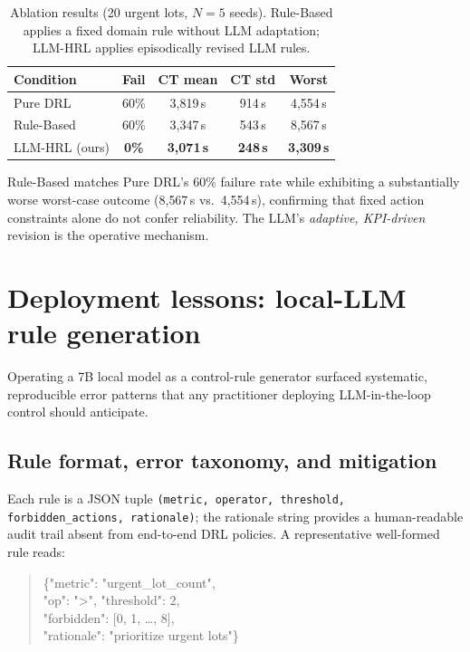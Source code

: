 \documentclass[10pt]{article}
\begin{document}
\begin{table}[thb]
\centering
\footnotesize
\caption{Ablation results (20 urgent lots, $N=5$ seeds).
Rule-Based applies a fixed domain rule without LLM adaptation;
LLM-HRL applies episodically revised LLM rules.}
\label{tab:ablation}
\setlength{\tabcolsep}{4pt}
\begin{tabularx}{\columnwidth}{@{}Xcccc@{}}
\toprule
\textbf{Condition} & \textbf{Fail} & \textbf{CT mean} & \textbf{CT std} & \textbf{Worst} \\
\midrule
Pure DRL        & 60\%          & 3{,}819\,s & 914\,s  & 4{,}554\,s \\
Rule-Based      & 60\%          & 3{,}347\,s & 543\,s  & 8{,}567\,s \\
LLM-HRL (ours)  & \textbf{0\%}  & \textbf{3{,}071\,s} & \textbf{248\,s} & \textbf{3{,}309\,s} \\
\bottomrule
\end{tabularx}
\end{table}

Rule-Based matches Pure DRL's 60\% failure rate while exhibiting a substantially
worse worst-case outcome (8{,}567\,s vs.\ 4{,}554\,s), confirming that
fixed action constraints alone do not confer reliability.
The LLM's \emph{adaptive, KPI-driven} revision is the operative mechanism.

\section{Deployment lessons: local-LLM rule generation}
\label{sec:lessons}

Operating a 7B local model as a control-rule generator surfaced systematic,
reproducible error patterns that any practitioner deploying LLM-in-the-loop
control should anticipate.

\subsection{Rule format, error taxonomy, and mitigation}
Each rule is a JSON tuple \texttt{(metric, operator, threshold,
forbidden\_actions, rationale)}; the rationale string provides a
human-readable audit trail absent from end-to-end DRL policies.
A representative well-formed rule reads:
\begin{quote}
\footnotesize\ttfamily
\{"metric": "urgent\_lot\_count",\\
\phantom{\{}"op": "{>}", "threshold": 2,\\
\phantom{\{}"forbidden": [0, 1, \ldots, 8],\\
\phantom{\{}"rationale": "prioritize urgent lots"\}
\end{quote}
\end{document}
